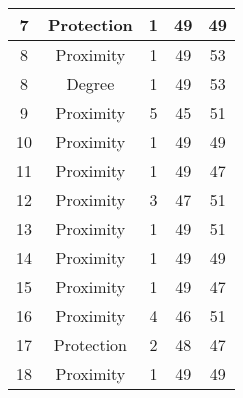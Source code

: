 \documentclass[results.tex]{subfiles}
\begin{document}
\begin{center}
\begin{tabular}{| c || c | c | c | c |}
            \hline
            7                       & Protection                   & 1                      & 49                      & 49                   \\
            \hline
            8                       & Proximity                    & 1                      & 49                      & 53                   \\
            \hline
            8                       & Degree                       & 1                      & 49                      & 53                   \\
            \hline
            9                       & Proximity                    & 5                      & 45                      & 51                   \\
            \hline
            10                      & Proximity                    & 1                      & 49                      & 49                   \\
            \hline
            11                      & Proximity                    & 1                      & 49                      & 47                   \\
            \hline
            12                      & Proximity                    & 3                      & 47                      & 51                   \\
            \hline
            13                      & Proximity                    & 1                      & 49                      & 51                   \\
            \hline
            14                      & Proximity                    & 1                      & 49                      & 49                   \\
            \hline
            15                      & Proximity                    & 1                      & 49                      & 47                   \\
            \hline
            16                      & Proximity                    & 4                      & 46                      & 51                   \\
            \hline
            17                      & Protection                   & 2                      & 48                      & 47                   \\
            \hline
            18                      & Proximity                    & 1                      & 49                      & 49                   \\

\end{tabular}
\end{center}
\end{document}
